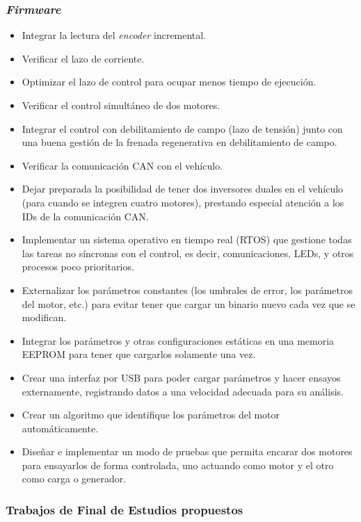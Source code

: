 \subsubsection*{\textit{Firmware}}

\begin{itemize}
	\item Integrar la lectura del \textit{encoder} incremental.
	\item Verificar el lazo de corriente.
	\item Optimizar el lazo de control para ocupar menos tiempo de ejecución.
	\item Verificar el control simultáneo de dos motores.
	\item Integrar el control con debilitamiento de campo (lazo de tensión) junto con una buena gestión de la frenada regenerativa en debilitamiento de campo.
	\item Verificar la comunicación CAN con el vehículo.
	\item Dejar preparada la posibilidad de tener dos inversores duales en el vehículo (para cuando se integren cuatro motores), prestando especial atención a los IDs de la comunicación CAN.
	\item Implementar un sistema operativo en tiempo real (RTOS) que gestione todas las tareas no síncronas con el control, es decir, comunicaciones, LEDs, y otros procesos poco prioritarios.
	\item Externalizar los parámetros constantes (los umbrales de error, los parámetros del motor, etc.) para evitar tener que cargar un binario nuevo cada vez que se modifican.
	\item Integrar los parámetros y otras configuraciones estáticas en una memoria EEPROM para tener que cargarlos solamente una vez.
	\item Crear una interfaz por USB para poder cargar parámetros y hacer ensayos externamente, registrando datos a una velocidad adecuada para su análisis.
	\item Crear un algoritmo que identifique los parámetros del motor automáticamente.
	\item Diseñar e implementar un modo de pruebas que permita encarar dos motores para ensayarlos de forma controlada, uno actuando como motor y el otro como carga o generador.
\end{itemize}


\subsubsection*{Trabajos de Final de Estudios propuestos}

